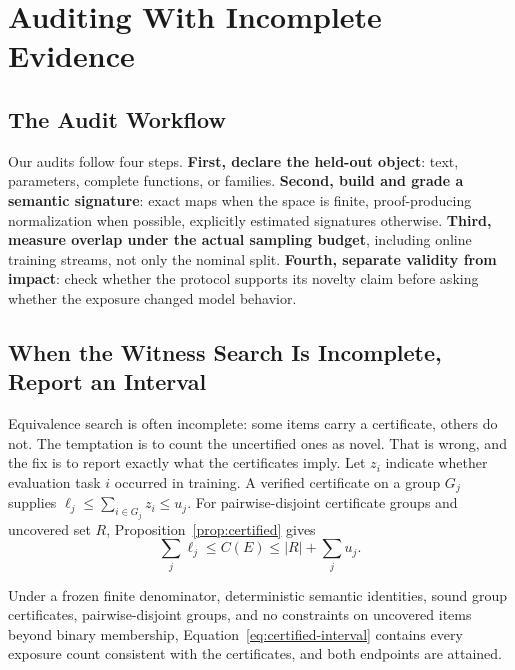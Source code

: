 \documentclass[twoside,11pt]{article}
\begin{document}
\section{Auditing With Incomplete Evidence}
\label{sec:certification}

\subsection{The Audit Workflow}

Our audits follow four steps.  \textbf{First, declare the held-out object}:
text, parameters, complete functions, or families.  \textbf{Second, build
and grade a semantic signature}: exact maps when the space is finite,
proof-producing normalization when possible, explicitly estimated
signatures otherwise.  \textbf{Third, measure overlap under the actual
sampling budget}, including online training streams, not only the nominal
split.  \textbf{Fourth, separate validity from impact}: check whether the
protocol supports its novelty claim before asking whether the exposure
changed model behavior.

\subsection{When the Witness Search Is Incomplete, Report an Interval}

Equivalence search is often incomplete: some items carry a certificate,
others do not.  The temptation is to count the uncertified ones as novel.
That is wrong, and the fix is to report exactly what the certificates
imply.  Let $z_i$ indicate whether evaluation task $i$ occurred in
training.  A verified certificate on a group $G_j$ supplies
$\ell_j\leq\sum_{i\in G_j}z_i\leq u_j$.  For pairwise-disjoint certificate
groups and uncovered set $R$, Proposition~\ref{prop:certified} gives
\begin{equation}
\boxed{
\sum_j\ell_j
\leq C(E)
\leq |R|+\sum_j u_j
}.
\label{eq:certified-interval}
\end{equation}

\begin{proposition}
\label{prop:certified}
Under a frozen finite denominator, deterministic semantic identities, sound
group certificates, pairwise-disjoint groups, and no constraints on uncovered
items beyond binary membership, Equation~\ref{eq:certified-interval} contains
every exposure count consistent with the certificates, and both endpoints are
attained.
\end{proposition}
\end{document}

